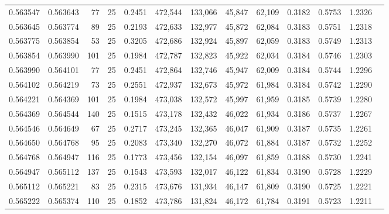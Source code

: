 \begin{tabular}{rrrrrrrrrrrrr}
0.563547 & 0.563643 &    77 &  25 &                                     0.2451 & 472,544 & 133,066 &  45,847 &  62,109 & 0.3182 & 0.5753 & 1.2326 \\
0.563645 & 0.563774 &    89 &  25 &                                     0.2193 & 472,633 & 132,977 &  45,872 &  62,084 & 0.3183 & 0.5751 & 1.2318 \\
0.563775 & 0.563854 &    53 &  25 &                                     0.3205 & 472,686 & 132,924 &  45,897 &  62,059 & 0.3183 & 0.5749 & 1.2313 \\
0.563854 & 0.563990 &   101 &  25 &                                     0.1984 & 472,787 & 132,823 &  45,922 &  62,034 & 0.3184 & 0.5746 & 1.2303 \\
0.563990 & 0.564101 &    77 &  25 &                                     0.2451 & 472,864 & 132,746 &  45,947 &  62,009 & 0.3184 & 0.5744 & 1.2296 \\
0.564102 & 0.564219 &    73 &  25 &                                     0.2551 & 472,937 & 132,673 &  45,972 &  61,984 & 0.3184 & 0.5742 & 1.2290 \\
0.564221 & 0.564369 &   101 &  25 &                                     0.1984 & 473,038 & 132,572 &  45,997 &  61,959 & 0.3185 & 0.5739 & 1.2280 \\
0.564369 & 0.564544 &   140 &  25 &                                     0.1515 & 473,178 & 132,432 &  46,022 &  61,934 & 0.3186 & 0.5737 & 1.2267 \\
0.564546 & 0.564649 &    67 &  25 &                                     0.2717 & 473,245 & 132,365 &  46,047 &  61,909 & 0.3187 & 0.5735 & 1.2261 \\
0.564650 & 0.564768 &    95 &  25 &                                     0.2083 & 473,340 & 132,270 &  46,072 &  61,884 & 0.3187 & 0.5732 & 1.2252 \\
0.564768 & 0.564947 &   116 &  25 &                                     0.1773 & 473,456 & 132,154 &  46,097 &  61,859 & 0.3188 & 0.5730 & 1.2241 \\
0.564947 & 0.565112 &   137 &  25 &                                     0.1543 & 473,593 & 132,017 &  46,122 &  61,834 & 0.3190 & 0.5728 & 1.2229 \\
0.565112 & 0.565221 &    83 &  25 &                                     0.2315 & 473,676 & 131,934 &  46,147 &  61,809 & 0.3190 & 0.5725 & 1.2221 \\
0.565222 & 0.565374 &   110 &  25 &                                     0.1852 & 473,786 & 131,824 &  46,172 &  61,784 & 0.3191 & 0.5723 & 1.2211 \\

\end{tabular}
